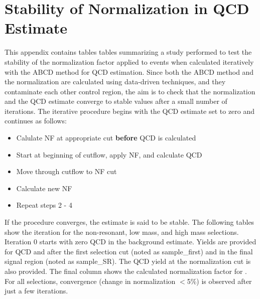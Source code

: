 \section{Stability of \ttbar Normalization in QCD Estimate}
\label{app:qcd_ttbarNFstability_appendix}

This appendix contains tables tables summarizing a study performed to test the stability of the normalization factor applied to \ttbar events when calculated iteratively with the ABCD method for QCD estimation. Since both the ABCD method and the \ttbar normalization are calculated using data-driven techniques, and they contaminate each other control region, the aim is to check that  the \ttbar normalization and the QCD estimate converge to stable values after a small number of iterations. The iterative procedure begins with the QCD estimate set to zero and continues as follows:
\begin{itemize}
\item Calulate \ttbar NF at appropriate cut \textbf{before} QCD is calculated
\item Start at beginning of cutflow, apply \ttbar NF, and calculate QCD
\item Move through cutflow to \ttbar NF cut
\item Calculate new \ttbar NF
\item Repeat steps 2 - 4
\end{itemize}
If the procedure converges, the estimate is said to be stable. The following tables show the iteration for the non-resonant, low mass, and high mass selections. Iteration 0 starts with zero QCD in the background estimate. Yields are provided for QCD and \ttbar after the first selection cut (noted as sample\_first) and in the final \mbb signal region (noted as sample\_SR). The QCD yield at the \ttbar normalization cut is also provided. The final column shows the calculated normalization factor for \ttbar. For all selections, convergence (change in \ttbar normalization $<$5\%) is observed after just a few iterations. 
